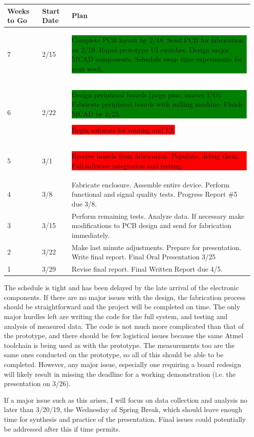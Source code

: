 \documentclass{article}
\begin{document}
	\begin{table}[H]
	\begin{tabular}{llp{4in}}
	Weeks to Go   & Start Date         & Plan \\
	\hline

	7 & 2/15 & \colorbox{green}{\parbox{4in}{Complete PCB layout by 2/18.  Send PCB for fabrication on 2/19.  Rapid prototype UI switches.  Design major MCAD components.  Schedule swap time experiments for next week.}}\\
	6 & 2/22 &  \colorbox{green}{\parbox{4in}{Design peripheral boards (pogo pins, master I/O).  Fabricate peripheral boards with milling machine.  Finish MCAD by 2/25.} }\colorbox{red}{ Begin software for routing and UI.}\\
	5 & 3/1  &  \colorbox{red}{\parbox{4in}{Receive boards from fabrication.  Populate, debug them.  Full software integration and testing.}}  \\
	4 & 3/8  &  Fabricate enclosure.  Assemble entire device.  Perform functional and signal quality tests.  Progress Report \#5 due 3/8.  \\
	3 & 3/15 &  Perform remaining tests.  Analyze data. If necessary make modifications to PCB design and send for fabrication immediately.   \\
	2 & 3/22 &  Make last minute adjustments.  Prepare for presentation.  Write final report.  Final Oral Presentation 3/25  \\
	1 & 3/29 &  Revise final report.  Final Written Report due 4/5.    
	\end{tabular}
	\end{table}

	The schedule is tight and has been delayed by the late arrival of the electronic components.  If there are no major issues with the design, the fabrication process should be straightforward and the project will be completed on time.  The only major hurdles left are writing the code for the full system, and testing and analysis of measured data.  The code is not much more complicated than that of the prototype, and there should be few logistical issues because the same Atmel toolchain is being used as with the prototype.  The measurements too are the same ones conducted on the prototype, so all of this should be able to be completed.  However, any major issue, especially one requiring a board redesign will likely result in missing the deadline for a working demonstration (i.e. the presentation on 3/26).

	If a major issue such as this arises, I will focus on data collection and analysis no later than 3/20/19, the Wednesday of Spring Break, which should leave enough time for synthesis and practice of the presentation.  Final issues could potentially be addressed after this if time permits.
\end{document}
